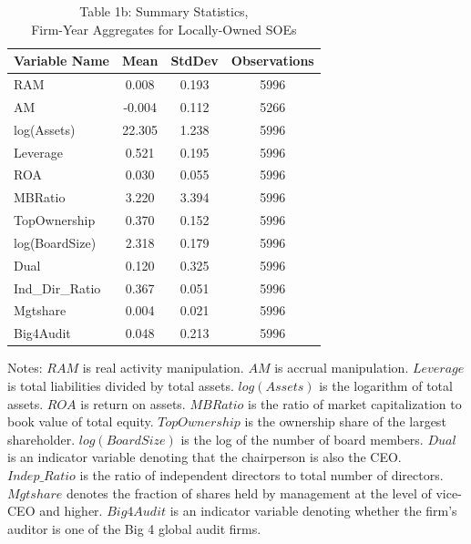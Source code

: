 \begin{table}[p]\centering\footnotesize{
\begin{threeparttable}
\captionsetup{width=\textwidth,labelformat=empty}
\caption{Table 1b: Summary Statistics, \\ Firm-Year Aggregates for Locally-Owned SOEs}
\begin{tabular}{lccc}
\hline\hline
Variable Name & Mean & StdDev & Observations \\
\hline
RAM&0.008&0.193&5996\\
AM&-0.004&0.112&5266\\
log(Assets)&22.305&1.238&5996\\
Leverage&0.521&0.195&5996\\
ROA&0.030&0.055&5996\\
MBRatio&3.220&3.394&5996\\
TopOwnership&0.370&0.152&5996\\
log(BoardSize)&2.318&0.179&5996\\
Dual&0.120&0.325&5996\\
Ind\_Dir\_Ratio&0.367&0.051&5996\\
Mgtshare&0.004&0.021&5996\\
Big4Audit&0.048&0.213&5996\\
\hline\hline
\end{tabular}
\captionsetup{justification=justified,labelformat=empty}
\begin{tablenotes}\item Notes: $ RAM $ is real activity manipulation.  $ AM $ is accrual manipulation. $ Leverage $ is total liabilities divided by total assets. $ log(Assets) $ is the logarithm of total assets. $ ROA $ is return on assets. $ MBRatio $ is the ratio of market capitalization to book value of total equity. $ TopOwnership $ is the ownership share of the largest shareholder. $ log(BoardSize) $ is the log of the number of board members. $ Dual $ is an indicator variable denoting that the chairperson is also the CEO. $ Indep\_Ratio $ is the ratio of independent directors to total number of directors. $ Mgtshare $ denotes the fraction of shares held by management at the level of vice-CEO and higher. $ Big4Audit $ is an indicator variable denoting whether the firm's auditor is one of the Big 4 global audit firms. \end{tablenotes}
\end{threeparttable}}\end{table}
